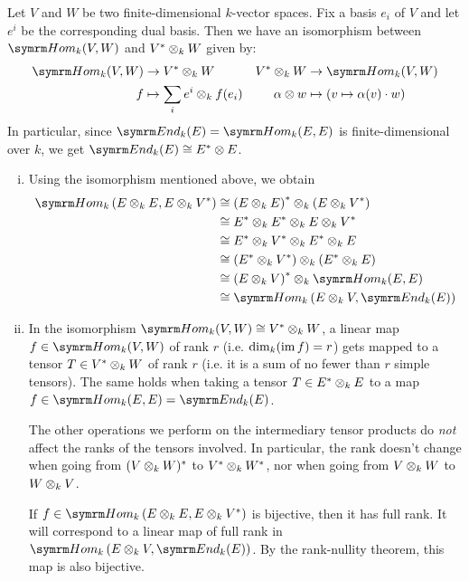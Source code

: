 \begin{solution}
Let \(V\) and \(W\) be two finite-dimensional \(k\)-vector spaces. Fix a basis \(e_i\) of \(V\) and let \(e^i\) be the corresponding dual basis. Then we have an isomorphism between \(\Hom_k (V, W)\) and \(V^* \otimes_k W\) given by:
\begin{align*}
    \Hom_k (V, W) &\to V^* \tensor_k W & V^* \tensor_k W &\to \Hom_k (V, W) \\
    f &\mapsto \sum_{i} e^{i} \tensor_k f(e_i) & \alpha \tensor w &\mapsto \left(v \mapsto \alpha(v) \cdot w\right)
\end{align*}
In particular, since \(\End_k (E) = \Hom_k (E, E)\) is finite-dimensional over \(k\), we get \(\End_k (E) \cong E^* \tensor E\).

\begin{enumerate}[(i)]
    \item Using the isomorphism mentioned above, we obtain
    \begin{align*}
        \Hom_k \left(E \tensor_k E, E \tensor_k V^*\right) &\cong \left(E \tensor_k E\right)^* \tensor_k \left(E \tensor_k V^*\right) \\
        &\cong E^* \tensor_k E^* \tensor_k E \tensor_k V^* \\
        &\cong E^* \tensor_k V^* \tensor_k E^* \tensor_k E \\
        &\cong \left(E^* \tensor_k V^*\right) \tensor_k \left(E^* \tensor_k E\right) \\
        &\cong \left(E \tensor_k V\right)^* \tensor_k \Hom_k (E, E) \\
        &\cong \Hom_k \left(E \tensor_k V, \End_k (E)\right)
    \end{align*}

    \item In the isomorphism \(\Hom_k (V, W) \cong V^* \tensor_k W\), a linear map \(f \in \Hom_k (V, W)\) of rank \(r\) (i.e. \(\dim_k (\operatorname*{im} f) = r\)) gets mapped to a tensor \(T \in V^* \otimes_k W\) of rank \(r\) (i.e. it is a sum of no fewer than \(r\) simple tensors). The same holds when taking a tensor \(T \in E^* \otimes_k E\) to a map \(f \in \Hom_k (E, E) = \End_k (E)\).

    The other operations we perform on the intermediary tensor products do \emph{not} affect the ranks of the tensors involved. In particular, the rank doesn't change when going from \((V \otimes_k W)^*\) to \(V^* \otimes_k W^*\), nor when going from \(V \otimes_k W\) to \(W \otimes_k V\).

    If \(f \in \Hom_k \left(E \tensor_k E, E \tensor_k V^*\right)\) is bijective, then it has full rank. It will correspond to a linear map of full rank in \(\Hom_k \left(E \tensor_k V, \End_k(E)\right)\). By the rank-nullity theorem, this map is also bijective.
\end{enumerate}
\end{solution}


